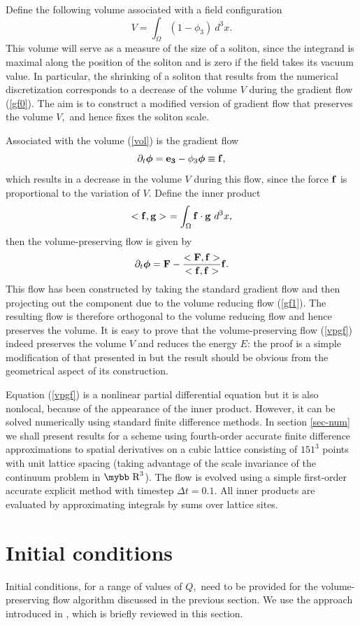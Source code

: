 \documentclass[12pt]{article}
\newcommand{\be}{\begin{equation}}
\newcommand{\ee}{\end{equation}}
\newcommand{\bphi}{\mbox{\boldmath $\phi$}}
\def\bb#1{\hbox{\mybb#1}}
\newcommand{\news}{\setcounter{equation}{0}\quad}
\begin{document}
Define the following volume associated with a field configuration
\be
V=\int_\Omega (1-\phi_3)\ d^3x.
\label{vol}
\ee
This volume will serve as a measure of the size of a soliton, since
the integrand is maximal along the position of the soliton and is
zero if the field takes its vacuum value. In particular, the shrinking of
a soliton that results from the numerical discretization corresponds to
a decrease of the volume $V$ during the gradient flow (\ref{gf0}).
The aim is to construct a modified version of gradient flow that
preserves the volume $V,$ and hence fixes the soliton scale.

Associated with the volume (\ref{vol}) is the gradient flow 
\be
\partial_{t}\bphi={\bf e_3}-\phi_3\bphi\equiv {\bf f},
\label{gf1}
\ee
which results in a decrease in the volume $V$ during this flow, since
the force ${\bf f}$ is proportional to the variation of $V.$
Define the inner product
\be
<{\bf f},{\bf g}>\ =\int_{\Omega} {\bf f}\cdot {\bf g}\ d^3x,
\label{inner}
\ee
then the volume-preserving flow is given by
\be
\partial_t\bphi={\bf F}-\frac{<{\bf F},{\bf f}>}{<{\bf f},{\bf f}>}{\bf f}.
\label{vpgf}
\ee
This flow has been constructed by taking the standard gradient flow 
and then projecting out the component due to the volume reducing 
flow (\ref{gf1}). The resulting flow is therefore orthogonal to the
volume reducing flow and hence preserves the volume. 
It is easy to prove that the volume-preserving flow (\ref{vpgf}) indeed
preserves the volume $V$ and reduces the energy $E$: the proof
is a simple modification of that presented in \cite{GS} but the
result should be obvious from the geometrical aspect of its construction.

Equation (\ref{vpgf}) is a nonlinear partial differential
equation but it is also nonlocal, because of the appearance of the inner
product. However, it can be solved numerically using standard finite
difference methods. In section \ref{sec-num} we shall present results 
for a scheme using fourth-order accurate finite difference approximations 
to spatial derivatives on a cubic lattice consisting of 
$151^3$ points with unit lattice spacing (taking advantage of the
scale invariance of the continuum problem in $\bb{R}^3$). 
The flow is evolved using a simple first-order accurate explicit method with
timestep $\Delta t=0.1.$ All inner products are evaluated by approximating
integrals by sums over lattice sites.


\section{Initial conditions}\news
Initial conditions, for a range of values of $Q,$ need to be provided 
for the volume-preserving flow algorithm discussed
in the previous section. We use the approach introduced in \cite{Su},
which is briefly reviewed in this section.
\end{document}

